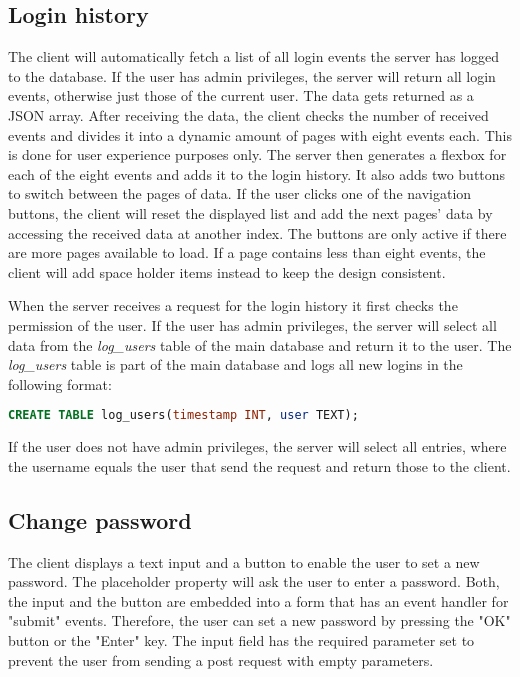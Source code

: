 \subsection{Login history}
\label{subsec:login_history}
The client will automatically fetch a list of all login events the server has logged to the database. If the user has admin privileges, the server will return all login events, otherwise just those of the current user. The data gets returned as a JSON array.
After receiving the data, the client checks the number of received events and divides it into a dynamic amount of pages with eight events each. This is done for user experience purposes only. The server then generates a flexbox for each of the eight events and adds it to the login history. It also adds two buttons to switch between the pages of data.
If the user clicks one of the navigation buttons, the client will reset the displayed list and add the next pages' data by accessing the received data at another index.  The buttons are only active if there are more pages available to load.
If a page contains less than eight events, the client will add space holder items instead to keep the design consistent.

When the server receives a request for the login history it first checks the permission of the user. If the user has admin privileges, the server will select all data from the \textit{log\_users} table of the main database and return it to the user.  The \textit{log\_users} table is part of the main database and logs all new logins in the following format:

\begin{lstlisting}[label = lst:log_users, language = SQL, numbers = none]
 CREATE TABLE log_users(timestamp INT, user TEXT);
\end{lstlisting}

If the user does not have admin privileges, the server will select all entries, where the username equals the user that send the request and return those to the client.


\subsection{Change password}
\label{subsec:change_password}
The client displays a text input and a button to enable the user to set a new password. The placeholder property will ask the user to enter a password. Both, the input and the button are embedded into a form that has an event handler for "submit" events. Therefore, the user can set a new password by pressing the "OK" button or the "Enter" key.  The input field has the required parameter set to prevent the user from sending a post request with empty parameters.


